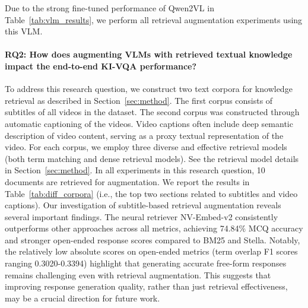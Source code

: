 Due to the strong fine-tuned performance of Qwen2VL in Table~\ref{tab:vlm_results}, we perform all retrieval augmentation experiments using this VLM. 



\paragraph{\textbf{RQ2: How does augmenting VLMs with retrieved textual knowledge impact the end-to-end KI-VQA performance?}}
To address this research question, we construct two text corpora for knowledge retrieval as described in Section~\ref{sec:method}. The first corpus consists of subtitles of all videos in the dataset. The second corpus was constructed through automatic captioning of the videos. Video captions often include deep semantic description of video content, serving as a proxy textual representation of the video. For each corpus, we employ three diverse and effective retrieval models (both term matching and dense retrieval models). See the retrieval model details in Section~\ref{sec:method}. In all experiments in this research question, 10 documents are retrieved for augmentation. We report the results in Table~\ref{tab:diff_corpora} (i.e., the top two sections related to subtitles and video captions). 
Our investigation of subtitle-based retrieval augmentation reveals several important findings. The neural retriever NV-Embed-v2 consistently outperforms other approaches across all metrics, achieving 74.84\% MCQ accuracy and stronger open-ended response scores compared to BM25 and Stella.  Notably, the relatively low absolute scores on open-ended metrics (term overlap F1 scores ranging 0.3020-0.3394) highlight that generating accurate free-form responses remains challenging even with retrieval augmentation. This suggests that improving response generation quality, rather than just retrieval effectiveness, may be a crucial direction for future work.


